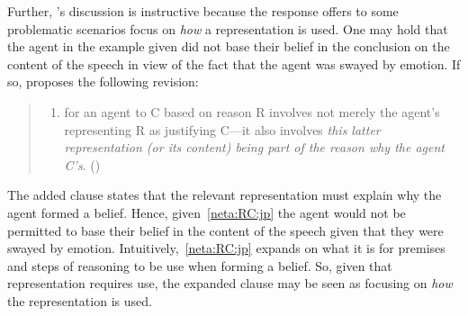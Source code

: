 \begin{note}[Representationalism]
  Further, \citeauthor{Neta:2019aa}'s discussion is instructive because the response \citeauthor{Neta:2019aa} offers to some problematic scenarios focus on \emph{how} a representation is used.
  One may hold that the agent in the example given did not base their belief in the conclusion on the content of the speech in view of the fact that the agent was swayed by emotion.
  If so, \citeauthor{Neta:2019aa} proposes the following revision:
  \begin{quote}
    \begin{enumerate}[label=(R\arabic*\('\)), ref=(R\arabic*\('\))]
    \item\label{neta:RC:jp} for an agent to C based on reason R involves not merely the agent's representing R as justifying C---it also involves \emph{this latter representation (or its content) being part of the reason why the agent C's}.\nolinebreak
      \mbox{}\hfill\mbox{(\citeyear[197]{Neta:2019aa})}
    \end{enumerate}
  \end{quote}
  The added clause states that the relevant representation must explain why the agent formed a belief.
  Hence, given~\ref{neta:RC:jp} the agent would not be permitted to base their belief in the content of the speech given that they were swayed by emotion.
  Intuitively,~\ref{neta:RC:jp} expands on what it is for premises and steps of reasoning to be use when forming a belief.
  So, given that representation requires use, the expanded clause may be seen as focusing on \emph{how} the representation is used.
\end{note}

